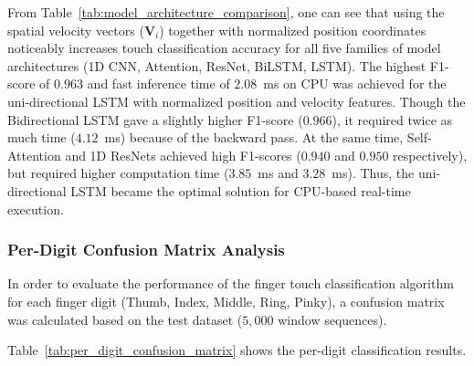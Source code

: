 From Table~\ref{tab:model_architecture_comparison}, one can see that using the spatial velocity vectors ($\mathbf{V}_i$) together with normalized position coordinates noticeably increases touch classification accuracy for all five families of model architectures (1D CNN, Attention, ResNet, BiLSTM, LSTM). The highest F1-score of $0.963$ and fast inference time of $2.08$~ms on CPU was achieved for the uni-directional LSTM with normalized position and velocity features. Though the Bidirectional LSTM gave a slightly higher F1-score ($0.966$), it required twice as much time ($4.12$~ms) because of the backward pass. At the same time, Self-Attention and 1D ResNets achieved high F1-scores ($0.940$ and $0.950$ respectively), but required higher computation time ($3.85$~ms and $3.28$~ms). Thus, the uni-directional LSTM became the optimal solution for CPU-based real-time execution.

\subsubsection{Per-Digit Confusion Matrix Analysis}
In order to evaluate the performance of the finger touch classification algorithm for each finger digit (Thumb, Index, Middle, Ring, Pinky), a confusion matrix was calculated based on the test dataset ($5,000$ window sequences).

Table~\ref{tab:per_digit_confusion_matrix} shows the per-digit classification results.

\begin{table}[htbp]
\centering
\caption{Per-digit touch classification performance metrics.}
\label{tab:per_digit_confusion_matrix}
\end{table}

